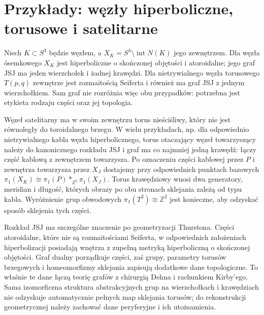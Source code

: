 \section{Przykłady: węzły hiperboliczne, torusowe i satelitarne}
\label{sec:tg-jsj-knots}

\begin{przyklad}
Niech $K\subset S^3$ będzie węzłem, a
$X_K=S^3\setminus\operatorname{int}N(K)$ jego
zewnętrzem. Dla węzła ósemkowego $X_K$ jest
hiperboliczne o skończonej objętości i atoroidalne;
jego graf JSJ ma jeden wierzchołek i żadnej krawędzi.
Dla nietrywialnego węzła torusowego $T(p,q)$
zewnętrze jest rozmaitością Seiferta i również
ma graf JSJ z jednym wierzchołkiem. Sam graf nie
rozróżnia więc obu przypadków: potrzebna jest
etykieta rodzaju części oraz jej topologia.

Węzeł satelitarny ma w swoim zewnętrzu torus nieściśliwy,
który nie jest równoległy do toroidalnego brzegu.
W wielu przykładach, np. dla odpowiednio
nietrywialnego kabla węzła hiperbolicznego,
torus otaczający węzeł towarzyszący należy do
kanonicznego rozkładu JSJ i graf ma co najmniej jedną
krawędź: łączy część kablową z zewnętrzem
towarzysza. Po oznaczeniu części kablowej przez $P$
i zewnętrza towarzysza przez $X_J$ dostajemy przy
odpowiednich punktach bazowych
$\pi_1(X_K)\cong\pi_1(P)*_{\mathbb Z^2}\pi_1(X_J)$.
Torus krawędziowy wnosi dwa generatory, meridian i długość,
których obrazy po obu stronach sklejania zależą od typu kabla. Wyróżnienie grup obwodowych
$\pi_1(T^2)\cong\mathbb Z^2$ jest konieczne,
aby odzyskać sposób sklejenia tych części.
\end{przyklad}

\begin{uwaga}
Rozkład JSJ ma szczególne znaczenie po
geometryzacji Thurstona. Części atoroidalne,
które nie są rozmaitościami Seiferta, w
odpowiednich założeniach hiperbolizacji
posiadają wnętrza z zupełną metryką
hiperboliczną o skończonej objętości.
Graf dualny porządkuje części, zaś grupy,
parametry torusów brzegowych i homeomorfizmy
sklejania zapisują dodatkowe dane topologiczne.
To właśnie te dane łączą teorię grafów z
chirurgią Dehna i rachunkiem Kirby'ego. Sama
izomorficzna struktura abstrakcyjnych grup na wierzchołkach
i krawędziach nie odzyskuje automatycznie pełnych map
sklejania torusów; do rekonstrukcji geometrycznej
należy zachować dane peryferyjne i ich utożsamienia.
\end{uwaga}

